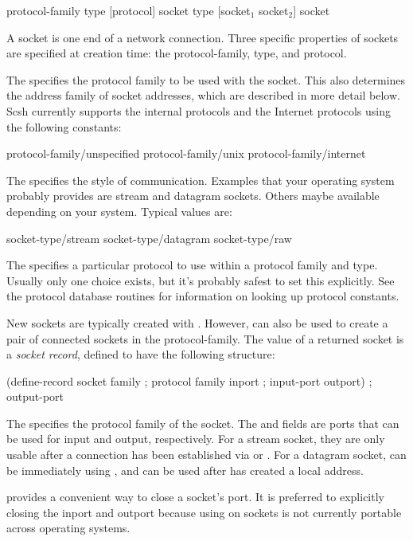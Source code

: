  {protocol-family type [protocol]} {socket}
 {type} {[socket$_{1}$ socket$_{2}$]}
   {socket} \undefined
\begin{desc}

A socket is one end of a network connection. Three specific properties
of sockets are specified at creation time: the protocol-family, type,
and protocol.

The  specifies the protocol family to be used with
the socket. This also determines the address family of socket addresses,
which are described in more detail below. Scsh currently supports the
{\Unix} internal protocols and the Internet protocols using the
following constants:
\begin{code}\codeallowbreaks
protocol-family/unspecified
protocol-family/unix
protocol-family/internet\end{code}

The  specifies the style of communication. Examples that your
operating system probably provides are stream and datagram sockets.
Others maybe available depending on your system. Typical values are:
\begin{code}\codeallowbreaks
socket-type/stream
socket-type/datagram
socket-type/raw\end{code}

The  specifies a particular protocol to use within a
protocol family and type. Usually only one choice exists, but it's
probably safest to set this explicitly. See the protocol database
routines for information on looking up protocol constants.

New sockets are typically created with . However,
 can also be used to create a pair of connected
sockets in the  protocol-family. The value of a
returned socket is a \emph{socket record}, defined to have the following
structure:
\begin{code}
(define-record socket
  family                                ; protocol family
  inport                                ; input-port
  outport)                              ; output-port\end{code}

The  specifies the protocol family of the socket. The
 and  fields are ports that can be used for input
and output, respectively. For a stream socket, they are only usable
after a connection has been established via  or
. For a datagram socket,  can be
immediately using , and  can be used after
 has created a local address.

 provides a convenient way to close a socket's port. It
is preferred to explicitly closing the inport and outport because using
 on sockets is not currently portable across operating systems.

\end{desc}

